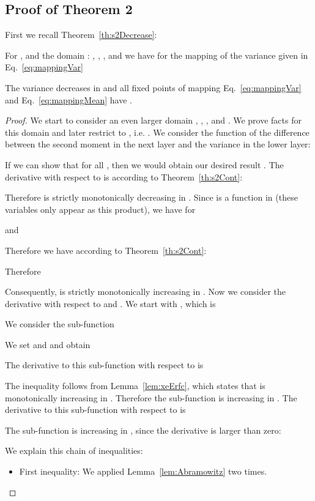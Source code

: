 \documentclass{article}
\begin{document}
\subsection{Proof of Theorem 2} 

First we recall Theorem~\ref{th:s2Decrease}:
\begin{theorem*}[Decreasing ]
For ,  
and the domain :
, 
,
, and 
 we have for 
the mapping of the variance
  given in Eq.~\eqref{eq:mappingVar}

The variance decreases in  and all fixed
points  of mapping Eq.~\eqref{eq:mappingVar} and Eq.~\eqref{eq:mappingMean} have .
\end{theorem*}




\begin{proof}
We start to consider an even larger domain
, 
,
, and 
.
We prove facts for this domain and later restrict to
, i.e. .
We consider the function  of the difference between the second moment  in the next layer
and the variance  in the lower layer:

If we can show that  for 
all , then
we would obtain our desired result . 
The derivative with respect to  is according to Theorem~\ref{th:s2Cont}:

Therefore  is strictly monotonically decreasing in .
Since  is a function in 
(these variables only appear as this product), we
have for 

and 

Therefore we have according to Theorem~\ref{th:s2Cont}:

Therefore

Consequently,  is strictly monotonically increasing in .
Now we consider the derivative with respect to  and . We start with , 
which is


We consider the sub-function

We set  and  and obtain


The derivative to this sub-function with respect to  is


The inequality follows from Lemma~\ref{lem:xeErfc}, which states that 
 is monotonically increasing in .
Therefore the sub-function is increasing in . The derivative to this sub-function with respect to  is


The sub-function is increasing in , since the
derivative is larger than zero:




We explain this chain of inequalities:
\begin{itemize}
\item First inequality: We applied Lemma~\ref{lem:Abramowitz} two times.


\end{itemize}
\end{proof}
\end{document}
